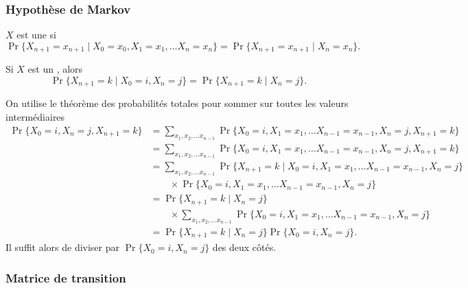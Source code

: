 \subsubsection{Hypothèse de Markov}

\begin{definition}[\CM]
  $X$ est une \cM si
  $$
  \Pr\{X_{n+1} = x_{n+1} \mid X_0 = x_0, X_1 = x_1, \dots X_n = x_n\} 
  = 
  \Pr\{X_{n+1} = x_{n+1} \mid X_n = x_n\}.
  $$
\end{definition}

\begin{proposition} \label{prop:loiConditionnalleEtatInitial}
  Si $X$ est un \cM, alors
  $$
  \Pr\{X_{n+1} = k \mid X_0 = i, X_n = j\} 
  = 
  \Pr\{X_{n+1} = k \mid X_n = j\}.
  $$
\end{proposition}

\proof
On utilise le théorème des probabilités totales pour sommer sur toutes les valeurs intermédiaires
  \begin{align*}
    \Pr\{X_0 = i, X_n = j, X_{n+1} = k\}
    & = \sum_{x_1, x_2, \dots x_{n-1}}
    \Pr\{X_0 = i, X_1 = x_1, \dots X_{n-1} = x_{n-1}, X_n = j, X_{n+1} = k\} \\
    & = \sum_{x_1, x_2, \dots x_{n-1}}
    \Pr\{X_0 = i, X_1 = x_1, \dots X_{n-1} = x_{n-1}, X_n = j, X_{n+1} = k\} \\
    & = \sum_{x_1, x_2, \dots x_{n-1}}
    \Pr\{X_{n+1} = k \mid X_0 = i, X_1 = x_1, \dots X_{n-1} = x_{n-1}, X_n = j\} \\
    & \qquad \times \Pr\{X_0 = i, X_1 = x_1, \dots X_{n-1} = x_{n-1}, X_n = j\} \\
    & = \Pr\{X_{n+1} = k \mid X_n = j\} \\
    & \qquad \times \sum_{x_1, x_2, \dots x_{n-1}} \Pr\{X_0 = i, X_1 = x_1, \dots X_{n-1} = x_{n-1}, X_n = j\} \\
    & = \Pr\{X_{n+1} = k \mid X_n = j\} \Pr\{X_0 = i, X_n = j\}.
  \end{align*}
  Il suffit alors de diviser par $\Pr\{X_0 = i, X_n = j\}$ des deux côtés. 
\eproof

\subsubsection{Matrice de transition}

